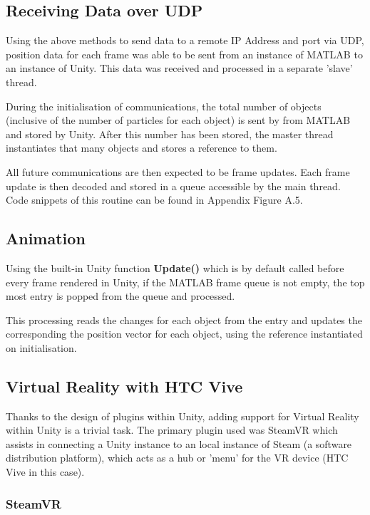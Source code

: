 \documentclass[12pt,openany,a4paper]{book}
\begin{document}
		\subsection{Receiving Data over UDP}
		Using the above methods to send data to a remote IP Address and port via UDP, position data for each frame was able to be sent from an instance of MATLAB to an instance of Unity. This data was received and processed in a separate 'slave' thread. \newline 
		
		During the initialisation of communications, the total number of objects (inclusive of the number of particles for each object) is sent by from MATLAB and stored by Unity. After this number has been stored, the master thread instantiates that many objects and stores a reference to them. \newline
		
		All future communications are then expected to be frame updates. Each frame update is then decoded and stored in a queue accessible by the main thread. Code snippets of this routine can be found in Appendix Figure A.5.\newline

		\subsection{Animation}
		Using the built-in Unity function \textbf{Update()} which is by default called before every frame rendered in Unity, if the MATLAB frame queue is not empty, the top most entry is popped from the queue and processed. \newline
		
		This processing reads the changes for each object from the entry and updates the corresponding the position vector for each object, using the reference instantiated on initialisation. 
		
		\subsection{Virtual Reality with HTC Vive}
		Thanks to the design of plugins within Unity, adding support for Virtual Reality within Unity is a trivial task. The primary plugin used was SteamVR which assists in connecting a Unity instance to an local instance of Steam (a software distribution platform), which acts as a hub or 'menu' for the VR device (HTC Vive in this case). 
		\subsubsection{SteamVR}
		
\end{document}
